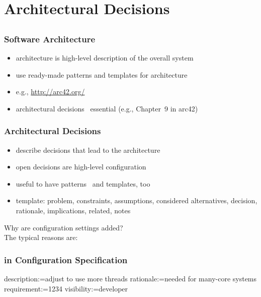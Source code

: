 \section{Architectural Decisions}

\subsection{}

\begin{frame}
	\frametitle{Software Architecture}
	\begin{itemize}
	\item architecture is high-level description of the overall system
	\item use ready-made patterns and templates for architecture
	\pause
	\item e.g., \url{http://arc42.org/}
	\item architectural decisions~\cite{zdun2007patterns} essential (e.g., Chapter~9 in arc42)
	\end{itemize}
\end{frame}

\begin{frame}
	\frametitle{Architectural Decisions}
	\begin{itemize}
	\item describe decisions that lead to the architecture
	\item open decisions are high-level configuration
	\item useful to have patterns~\cite{zdun2007patterns} and templates, too
	\item template: problem, constraints, assumptions, considered alternatives, decision, rationale, implications, related, notes
	\end{itemize}
\end{frame}

\begin{frame}
	Why are configuration settings added? \\[1cm]
	\pause
	The typical reasons are:
\end{frame}

\begin{frame}[fragile]
	\frametitle{in Configuration Specification}
	\begin{code}
	description:=adjust to use more threads
	rationale:=needed for many-core systems
	requirement:=1234
	visibility:=developer
	\end{code}
\end{frame}

